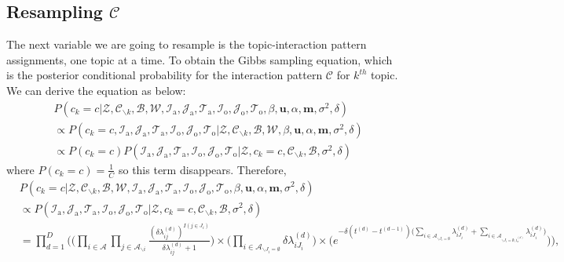 \documentclass[a4paper]{article}
\begin{document}
 \subsection{Resampling $\mathcal{C}$} \label{subsec: Resampling C}
 The next variable we are going to resample is the topic-interaction pattern assignments, one topic at a time. To obtain the Gibbs sampling equation, which is the posterior conditional probability for the interaction pattern $\mathcal{C}$ for $k^{th}$ topic. We can derive the equation as below:
 \begin{equation}
 \begin{aligned} & P(c_k=c|\mathcal{Z},   \mathcal{C}_{\backslash k},   \mathcal{B},\mathcal{W}, \mathcal{I}_{\mbox{a}}, \mathcal{J}_{\mbox{a}}, \mathcal{T}_{\mbox{a}}, \mathcal{I}_{\mbox{o}}, \mathcal{J}_{\mbox{o}}, \mathcal{T}_{\mbox{o}}, \beta, \boldsymbol{u}, \alpha, \boldsymbol{m}, \sigma^2,  \delta)\\
 &\propto P(c_k=c, \mathcal{I}_{\mbox{a}}, \mathcal{J}_{\mbox{a}}, \mathcal{T}_{\mbox{a}}, \mathcal{I}_{\mbox{o}}, \mathcal{J}_{\mbox{o}}, \mathcal{T}_{\mbox{o}}|\mathcal{Z}, \mathcal{C}_{\backslash k},   \mathcal{B},\mathcal{W}, \beta, \boldsymbol{u}, \alpha, \boldsymbol{m}, \sigma^2, \delta)\\
& \propto P(c_k=c)P(\mathcal{I}_{\mbox{a}}, \mathcal{J}_{\mbox{a}}, \mathcal{T}_{\mbox{a}}, \mathcal{I}_{\mbox{o}}, \mathcal{J}_{\mbox{o}}, \mathcal{T}_{\mbox{o}}| \mathcal{Z}, c_k=c, \mathcal{C}_{\backslash k}, \mathcal{B}, \sigma^2, \delta)
 \end{aligned}
 \end{equation}
 where $P(c_k=c) = \frac{1}{C}$ so this term disappears. Therefore, 
 \begin{equation}
 \begin{aligned}
 &P(c_k=c|\mathcal{Z},   \mathcal{C}_{\backslash k},   \mathcal{B},\mathcal{W}, \mathcal{I}_{\mbox{a}}, \mathcal{J}_{\mbox{a}}, \mathcal{T}_{\mbox{a}}, \mathcal{I}_{\mbox{o}}, \mathcal{J}_{\mbox{o}}, \mathcal{T}_{\mbox{o}}, \beta, \boldsymbol{u}, \alpha, \boldsymbol{m}, \sigma^2, \delta)\\&\propto P(\mathcal{I}_{\mbox{a}}, \mathcal{J}_{\mbox{a}}, \mathcal{T}_{\mbox{a}}, \mathcal{I}_{\mbox{o}}, \mathcal{J}_{\mbox{o}}, \mathcal{T}_{\mbox{o}}| \mathcal{Z}, c_k=c, \mathcal{C}_{\backslash k}, \mathcal{B}, \sigma^2,  \delta)\\&=\prod_{d=1}^D\Bigg(\Big(\prod_{i\in \mathcal{A}}\prod_{j \in \mathcal{A}_{\backslash i }} \frac{(\delta\lambda^{(d)}_{ij})^{I(j \in J_i)}}{\delta\lambda^{(d)}_{ij}+1}\Big)\times \Big(\prod_{i\in \mathcal{A}_{\backslash J_i=\emptyset}} \delta\lambda^{(d)}_{iJ_i}\Big) \times \Big(e^{-\delta(t^{(d)}-t^{(d-1)})\big(\sum\limits_{i \in \mathcal{A}_{\backslash J_i=\emptyset}}\lambda^{(d)}_{i{J_i}}+\sum\limits_{i \in \mathcal{A}_{\backslash J_i=\emptyset, i_o^{(d)}}}\lambda^{(d)}_{i{J_i}}\big)}\Big)\bigg),
 \end{aligned}
 \end{equation} 
\end{document}
